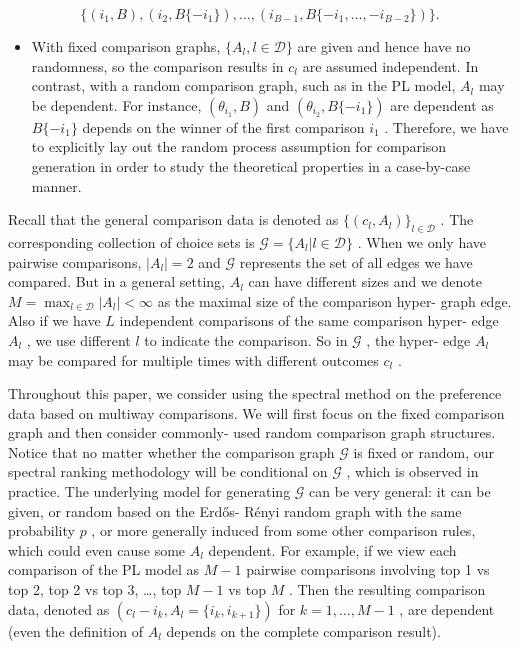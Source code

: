 \[
\{(i_{1}, B), (i_{2}, B\{-i_{1}\}), \dots , (i_{B - 1}, B\{-i_{1}, \dots , -i_{B - 2}\})\} .
\]

\begin{itemize}
\tightlist
\item
  With fixed comparison graphs, \(\{A_{l},l\in \mathcal{D}\}\) are given
  and hence have no randomness, so the comparison results in \(c_{l}\)
  are assumed independent. In contrast, with a random comparison graph,
  such as in the PL model, \(A_{l}\) may be dependent. For instance,
  \((\theta_{i_{1}},B)\) and \((\theta_{i_{2}},B\{-i_{1}\})\) are
  dependent as \(B\{-i_{1}\}\) depends on the winner of the first
  comparison \(i_{1}\) . Therefore, we have to explicitly lay out the
  random process assumption for comparison generation in order to study
  the theoretical properties in a case-by-case manner.
\end{itemize}

Recall that the general comparison data is denoted as
\(\{(c_{l},A_{l})\}_{l\in \mathcal{D}}\) . The corresponding collection
of choice sets is \(\mathcal{G} = \{A_{l}|l\in \mathcal{D}\}\) . When we
only have pairwise comparisons, \(|A_{l}| = 2\) and \(\mathcal{G}\)
represents the set of all edges we have compared. But in a general
setting, \(A_{l}\) can have different sizes and we denote
\(M = \max_{l\in \mathcal{D}}|A_{l}|< \infty\) as the maximal size of
the comparison hyper- graph edge. Also if we have \(L\) independent
comparisons of the same comparison hyper- edge \(A_{l}\) , we use
different \(l\) to indicate the comparison. So in \(\mathcal{G}\) , the
hyper- edge \(A_{l}\) may be compared for multiple times with different
outcomes \(c_{l}\) .

Throughout this paper, we consider using the spectral method on the
preference data based on multiway comparisons. We will first focus on
the fixed comparison graph and then consider commonly- used random
comparison graph structures. Notice that no matter whether the
comparison graph \(\mathcal{G}\) is fixed or random, our spectral
ranking methodology will be conditional on \(\mathcal{G}\) , which is
observed in practice. The underlying model for generating
\(\mathcal{G}\) can be very general: it can be given, or random based on
the Erdős- Rényi random graph with the same probability \(p\) , or more
generally induced from some other comparison rules, which could even
cause some \(A_{l}\) dependent. For example, if we view each comparison
of the PL model as \(M - 1\) pairwise comparisons involving top 1 vs top
2, top 2 vs top 3, \ldots, top \(M - 1\) vs top \(M\) . Then the
resulting comparison data, denoted as
\((c_{l} - i_{k},A_{l} = \{i_{k},i_{k + 1}\})\) for
\(k = 1,\ldots ,M - 1\) , are dependent (even the definition of
\(A_{l}\) depends on the complete comparison result).

